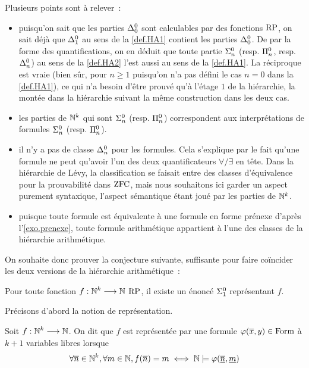 Plusieurs points sont à relever~:
\begin{itemize}
\item puisqu'on sait que les parties $\Delta^0_{0}$ sont calculables par des
  fonctions $\operatorname{RP}$, on sait déjà que $\Delta^0_{1}$ au sens de la
  \cref{def.HA1} contient les parties $\Delta^0_{0}$. De par la forme des
  quantifications, on en déduit que toute partie $\Sigma^0_{n}$ (resp.
  $\Pi^0_{n}$, resp.
  $\Delta^0_{n}$) au sens de la \cref{def.HA2} l'est aussi au sens de la
  \cref{def.HA1}. La réciproque est vraie (bien sûr, pour $n \geq 1$ puisqu'on
  n'a pas défini le cas $n = 0$ dans la \cref{def.HA1}), ce qui n'a besoin
  d'être prouvé qu'à l'étage $1$ de la hiérarchie, la montée dans la hiérarchie
  suivant la même construction dans les deux cas.
\item les parties de $\mathbb N^k$ qui sont $\Sigma^0_{n}$ (resp. $\Pi^0_{n}$)
  correspondent aux interprétations de formules $\Sigma^0_{n}$ (resp.
  $\Pi^0_{n}$).
\item il n'y a pas de classe $\Delta^0_{n}$ pour les formules. Cela s'explique
  par le fait qu'une formule ne peut qu'avoir l'un des deux
  quantificateurs $\forall / \exists$ en tête. Dans la hiérarchie de Lévy, la
  classification se faisait entre des classes d'équivalence pour la
  prouvabilité dans $\operatorname{ZFC}$, mais nous souhaitons ici garder un aspect purement
  syntaxique, l'aspect sémantique étant joué par les parties de $\mathbb N^k$.
\item puisque toute formule est équivalente à une formule en forme prénexe
  d'après l'\cref{exo.prenexe}, toute formule arithmétique appartient à l'une
  des classes de la hiérarchie arithmétique.
\end{itemize}

On souhaite donc prouver la conjecture suivante, suffisante pour faire coïncider
les deux versions de la hiérarchie arithmétique~:

\begin{conjecture}
  Pour toute fonction $f : \displaystyle \mathbb N^k \longrightarrow \mathbb N$ $\operatorname{RP}$, il existe un énoncé
  $\Sigma^0_{1}$ représentant $f$.
\end{conjecture}

\noindent
Précisons d'abord la notion de représentation.

\begin{definition}
  Soit $f : \displaystyle \mathbb N^k \longrightarrow \mathbb N$. On dit que $f$ est représentée par une
  formule $\varphi(\overline{x},y) \in \operatorname{Form}$ à $k+1$ variables libres lorsque
  \[\forall \overline{n}\in \mathbb N^k, \forall m \in \mathbb N,
  f(\overline{n}) = m \iff \mathbb N\models \varphi(\underline{\overline{n}}, \underline{m})\]
\end{definition}

